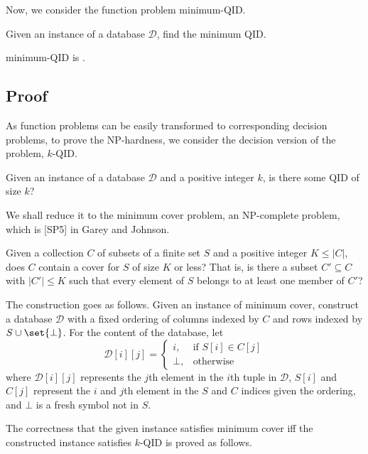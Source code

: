 \documentclass[12pt]{llncs}
\DeclarePairedDelimiter\set\{\}
\newcommand{\cD}{\mathcal{D}}
\begin{document}
Now, we consider the function problem minimum-QID.

\begin{problem}
Given an instance of a database $\cD$, find the minimum QID.
\end{problem}

\begin{proposition}
minimum-QID is .
\end{proposition}

\subsection{Proof}
As function problems can be easily transformed to corresponding decision problems, to prove the NP-hardness, we consider the decision version of the problem, $k$-QID.

\begin{problem}[$k$-QID]
Given an instance of a database $\cD$ and a positive integer $k$, is there some QID of size $k$?
\end{problem}

We shall reduce it to the minimum cover problem, an NP-complete problem, which is [SP5] in Garey and Johnson\cite{Garey:1990}.

\begin{problem}
Given a collection $C$ of subsets of a finite set $S$ and a positive integer $K \leq |C|$, does $C$ contain a cover for $S$ of size $K$ or less? That is, is there a subset $C' \subseteq C$ with $|C'| \leq K$ such that every element of $S$ belongs to at least one member of $C'$?
\end{problem}

The construction goes as follows. Given an instance of minimum cover, construct a database $\cD$ with a fixed ordering of columns indexed by $C$ and rows indexed by $S \cup \set{\bot}$. For the content of the database, let
$$
\cD[i][j] =
\begin{cases}
    i,    &\text{if } S[i] \in C[j]\\
    \bot, &\text{otherwise}
\end{cases}
$$
where $\cD[i][j]$ represents the $j$th element in the $i$th tuple in $\cD$, $S[i]$ and $C[j]$ represent the $i$ and $j$th element in the $S$ and $C$ indices given the ordering, and $\bot$ is a fresh symbol not in $S$.

The correctness that the given instance satisfies minimum cover iff the constructed instance satisfies $k$-QID is proved as follows.
\end{document}
